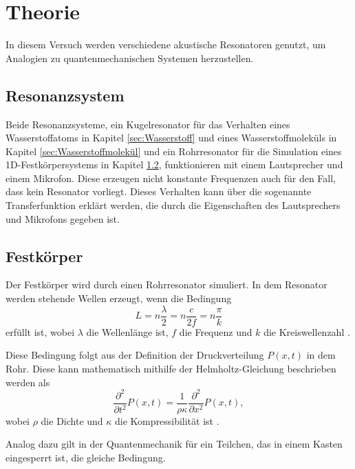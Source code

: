 \section{Theorie}
\label{sec:Theorie}

In diesem Versuch werden verschiedene akustische Resonatoren genutzt, um Analogien zu quantenmechanischen Systemen herzustellen. 

\subsection{Resonanzsystem}

Beide Resonanzsysteme, ein Kugelresonator für das Verhalten eines Wasserstoffatoms in Kapitel \ref{sec:Wasserstoff} und eines Wasserstoffmoleküls in Kapitel \ref{sec:Wasserstoffmolekül}  und ein Rohrresonator für die Simulation eines 1D-Festkörpersystems in Kapitel \ref{sec:Festkörper}, funktionieren mit einem Lautsprecher und einem Mikrofon. Diese erzeugen nicht konstante Frequenzen auch für den Fall, dass kein Resonator vorliegt.
Dieses Verhalten kann über die sogenannte Transferfunktion erklärt werden, die durch die Eigenschaften des Lautsprechers und Mikrofons gegeben ist. 

\subsection{Festkörper}
\label{sec:Festkörper}
Der Festkörper wird durch einen Rohrresonator simuliert. In dem Resonator werden stehende Wellen erzeugt, wenn die Bedingung  
\begin{equation}
    L = n \frac{\lambda}{2} = n \frac{c}{2f} = n \frac{\pi}{k} 
    \label{eq:speed}
\end{equation}
erfüllt ist, wobei $\lambda$ die Wellenlänge ist, $f$ die Frequenz und $k$ die Kreiswellenzahl \cite{QM1}. 

Diese Bedingung folgt aus der Definition der Druckverteilung $P(x,t)$ in dem Rohr. Diese kann mathematisch mithilfe der Helmholtz-Gleichung beschrieben werden als 
\begin{equation*}
    \frac{\partial^2}{\partial t^2} P(x,t) = \frac{1}{\rho\kappa}\frac{\partial^2}{\partial x^2} P(x,t),
\end{equation*}
wobei $\rho$ die Dichte und $\kappa$ die Kompressibilität ist \cite{QM1}. 

Analog dazu gilt in der Quantenmechanik für ein Teilchen, das in einem Kasten eingesperrt ist, die gleiche Bedingung. 

